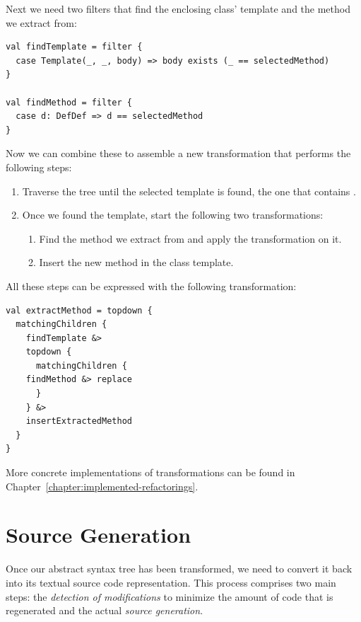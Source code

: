Next we need two filters that find the enclosing class' template and the method we extract from:

\begin{lstlisting}
val findTemplate = filter {
  case Template(_, _, body) => body exists (_ == selectedMethod)
}

val findMethod = filter {
  case d: DefDef => d == selectedMethod
}
\end{lstlisting}

Now we can combine these to assemble a new transformation that performs the following steps:

\begin{enumerate}
 \item Traverse the tree until the selected template is found, the one that contains .
 \item Once we found the template, start the following two transformations:
  \begin{enumerate}
        \item Find the method we extract from and apply the  transformation on it.
        \item Insert the new method in the class template.
       \end{enumerate}
\end{enumerate}


All these steps can be expressed with the following transformation:

\begin{lstlisting}
val extractMethod = topdown {
  matchingChildren {
    findTemplate &> 
    topdown {
      matchingChildren {
	findMethod &> replace
      }
    } &> 
    insertExtractedMethod
  }
}
\end{lstlisting}

More concrete implementations of transformations can be found in Chapter~\vref{chapter:implemented-refactorings}.

\newpage
\section{Source Generation}\label{section:source-generation}

Once our abstract syntax tree has been transformed, we need to convert it back into its textual source code representation. This process comprises two main steps: the \textit{detection of modifications} to minimize the amount of code that is regenerated and the actual \textit{source generation}.

